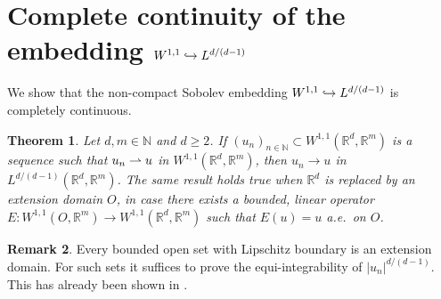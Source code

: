\documentclass[10pt]{amsart}
\def\hto{\mathrel{\lhook\joinrel\to}}
\def\harptod{\mathrel{\relbar\joinrel\rightharpoonup}}
\def\harpto{\mathchoice{\harptod}{\rightharpoonup}{\rightharpoonup}{\rightharpoonup}}
\newtheorem{theorem}{Theorem}[section]
\theoremstyle{definition}
\newtheorem{remark}[theorem]{Remark}
\newcommand{\R}{\mathbb{R}}
\newcommand{\N}{\mathbb{N}}
\begin{document}
\section{Complete continuity of the embedding \texorpdfstring{$W^{1,1}\hto L^{d/(d-1)}$}{}}\label{app:1}
We show that the non-compact Sobolev embedding $W^{1,1}\hto L^{d/(d-1)}$ is completely continuous.
\begin{theorem}\label{thm.embedding}
Let $d,m\in\N$ and $d\geq 2$. If $(u_n)_{n\in\N}\subset W^{1,1}(\R^d,\R^m)$ is a sequence such that $u_n\harpto u$ in $W^{1,1}(\R^d,\R^m)$, then $u_n\to u$ in $L^{d/(d-1)}(\R^d,\R^m)$. The same result holds true when $\R^d$ is replaced by an extension domain $O$, \ie in case there exists a bounded, linear operator $E:W^{1,1}(O,\R^m)\to W^{1,1}(\R^d,\R^m)$ such that $E(u)=u$ a.e.\ on $O$.
\end{theorem}
\begin{remark}
Every bounded open set with Lipschitz boundary is an extension domain. For such sets it suffices to prove the equi-integrability of $|u_n|^{d/(d-1)}$. This has already been shown in \cite[Lem.\,A.3]{DLFS}.
\end{remark}
\end{document}
